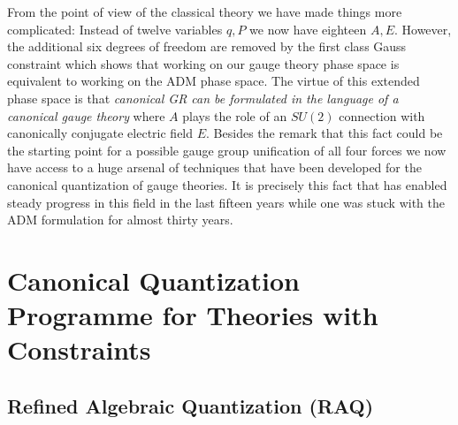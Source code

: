 \documentclass[12pt]{report}
\begin{document}
%
From the point of view of the 
classical theory we have made things more complicated: Instead of twelve 
variables $q,P$ we now have eighteen $A,E$. However, the additional six 
degrees of freedom are removed by the first class Gauss constraint which 
shows that
working on our gauge theory phase space is equivalent to working on the 
ADM phase space. The virtue of this extended phase space is that 
{\it canonical GR can be formulated in the language of a canonical gauge 
theory} where $A$ plays the role of an $SU(2)$ connection with 
canonically conjugate electric field $E$. Besides the remark that this fact
could be the starting point for a possible gauge group unification of all
four forces we now have access to a huge arsenal of techniques that have been
developed for the canonical quantization of gauge theories. It is 
precisely this fact that has enabled steady progress in this field in the 
last fifteen years while one was stuck with the ADM formulation for almost
thirty years.


\section{Canonical Quantization Programme for Theories with
Constraints}
\label{s1.3}

\subsection{Refined Algebraic Quantization (RAQ)}
\label{s1.3.1}
\end{document}
